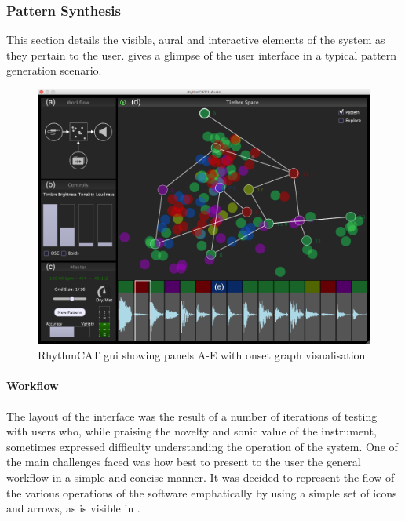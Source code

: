 \subsubsection{Pattern Synthesis}

This section details the visible, aural and interactive elements of the system as they pertain to the user.  gives a glimpse of the user interface in a typical pattern generation scenario.

\begin{figure}
	\begin{center}
		\includegraphics[scale=0.45]{ch06_rhythmcat/figures/rhythmcat.png}		
		\end{center}
		\caption[RhythmCAT user interface]{RhythmCAT \acrshort{gui} showing panels A-E with onset graph visualisation}
	\label{fig:rhythmcat_interface}
\end{figure}

\paragraph{Workflow}

The layout of the interface was the result of a number of iterations of testing with users who, while praising the novelty and sonic value of the instrument, sometimes expressed difficulty understanding the operation of the system. One of the main challenges faced was how best to present to the user the general workflow in a simple and concise manner. It was decided to represent the flow of the various operations of the software emphatically by using a simple set of icons and arrows, as is visible in .

